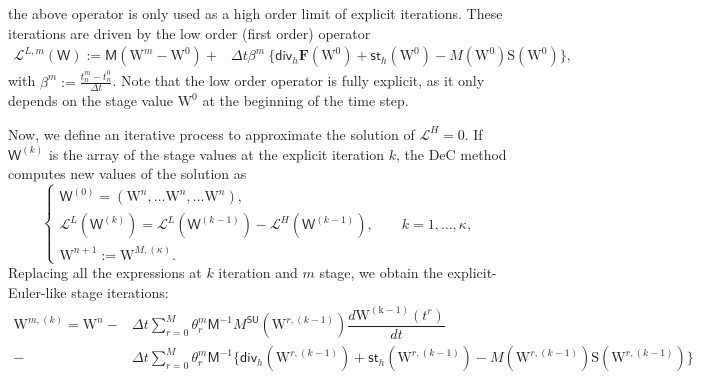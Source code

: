 \documentclass[a4paper,10pt]{article}
\begin{document}
the  above operator is only used   as a high order limit of explicit iterations. These iterations are driven by the  low order (first order)  operator  
\begin{equation}
\begin{split}
	\mathcal{L}^{L,m}(\mathsf{W}  ) :=   \mathsf{M}   (\mathrm{W}^m -  \mathrm{W}^0 )
	+& \Delta t \beta^m\ \{ \textsf{div}_h \mathbf{F}(\mathrm{W}^0)    + \mathsf{st}_h(\mathrm{W}^0)  -  M(\mathrm{W}^0 )
	 \mathrm{S}(\mathrm{W}^0)\},
	 \end{split}
\end{equation}
with $\beta^m := \frac{t^m_n-t^0_n}{\Delta t}$. Note that the low order operator is fully explicit, as it only depends on the stage value $\mathrm{W}^0$ at the beginning of the time step.

Now, we define an iterative process to approximate the solution of $\mathcal{L}^H=0$. If $\mathsf{W}^{(k)} $ is the array  of    the stage values at the explicit iteration $k$, the DeC method  computes new values of the solution as 
\begin{equation}
	\label{eq:DeC1}
	\begin{cases}
   	   \mathsf{W}^{(0)} =( \mathrm{W}^{n}, \dots \mathrm{W}^{n},   \dots \mathrm{W}^{n} ),\\
		\mathcal{L}^{L}(\mathsf{W}^{(k)} )=\mathcal{L}^{L}(\mathsf{W}^{(k-1)})-\mathcal{L}^{H}(\mathsf{W}^{(k-1)}), \qquad k=1,\dots, \kappa,\\
		\mathrm{W}^{n+1} := \mathrm{W}^{M,(\kappa)} .
	\end{cases}
\end{equation}
Replacing all the expressions at $k$ iteration and $m$ stage, we obtain the  explicit-Euler-like stage iterations:
\begin{equation}
	\label{eq:DeC2}
	\begin{split}
	     \mathrm{W}^{m,(k)}  =            \mathrm{W}^n
	- &\Delta t \sum_{r=0}^M \theta_r^m \mathsf{M}^{-1}  M^{\textsf{SU}}(\mathrm{W}^{r,(k-1)}) \dfrac{d\mathrm{W^{(k-1)}}(t^r)}{dt} \\
	-& \Delta t \sum_{r=0}^M \theta_r^m \mathsf{M}^{-1}  \{ \textsf{div}_h(\mathrm{W}^{r,(k-1)})    + \mathsf{st}_h(\mathrm{W}^{r,(k-1)})  - M(\mathrm{W}^{r,(k-1)} )\mathrm{S}(\mathrm{W}^{r,(k-1)})\}
	 \end{split}
\end{equation}
\end{document}
